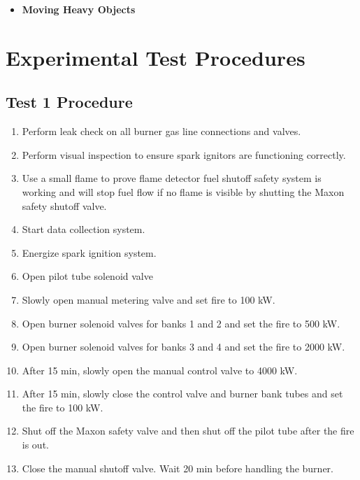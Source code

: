 \documentclass[12pt,oneside]{book}
\begin{document}
\begin{itemize}
\item {\bf Moving Heavy Objects}
\end{itemize}

\chapter{Experimental Test Procedures}
\label{test_procedure}
\section{Test 1 Procedure}
\label{procedure1}

\begin{enumerate}
  \item Perform leak check on all burner gas line connections and valves.
  \item Perform visual inspection to ensure spark ignitors are functioning correctly.
  \item Use a small flame to prove flame detector fuel shutoff safety system is working and will stop fuel flow if no flame is visible by shutting the Maxon safety shutoff valve.
  \item Start data collection system.
  \item Energize spark ignition system.
  \item Open pilot tube solenoid valve
  \item Slowly open manual metering valve and set fire to 100 kW.
  \item Open burner solenoid valves for banks 1 and 2 and set the fire to 500 kW.
  \item Open burner solenoid valves for banks 3 and 4 and set the fire to 2000 kW.
  \item After 15 min, slowly open the manual control valve to 4000 kW.
  \item After 15 min, slowly close the control valve and burner bank tubes and set the fire to 100 kW.
  \item Shut off the Maxon safety valve and then shut off the pilot tube after the fire is out.
  \item Close the manual shutoff valve. Wait 20 min before handling the burner.
\end{enumerate}
\end{document}
